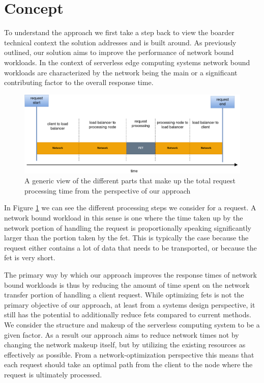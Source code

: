 \section{Concept}

To understand the approach we first take a step back to view the boarder technical context the solution addresses and is built around.
As previously outlined, our solution aims to improve the performance of network bound workloads.
In the context of serverless edge computing systems network bound workloads are characterized by the network being the main or a significant contributing factor to the overall response time.
\begin{figure}
    \centering
    \includegraphics[width=14cm]{graphics/diagrams/request_overview.png}
    \caption{A generic view of the different parts that make up the total request processing time from the perspective of our approach}
    \label{fig:request_net_fet_overview}
\end{figure}
In Figure \ref{fig:request_net_fet_overview} we can see the different processing steps we consider for a request.
A network bound workload in this sense is one where the time taken up by the network portion of handling the request is proportionally speaking significantly larger than the portion taken by the \gls{fet}.
This is typically the case because the request either contains a lot of data that needs to be transported, or because the \gls{fet} is very short.

The primary way by which our approach improves the response times of network bound workloads is thus by reducing the amount of time spent on the network transfer portion of handling a client request.
While optimizing \glspl{fet} is not the primary objective of our approach, at least from a systems design perspective, it still has the potential to additionally reduce \glspl{fet} compared to current methods.
We consider the structure and makeup of the serverless computing system to be a given factor. As a result our approach aims to reduce network times not by changing the network makeup itself, but by utilizing the existing resources as effectively as possible. From a network-optimization perspective this means that each request should take an optimal path from  the client to the node where the request is ultimately processed. 

